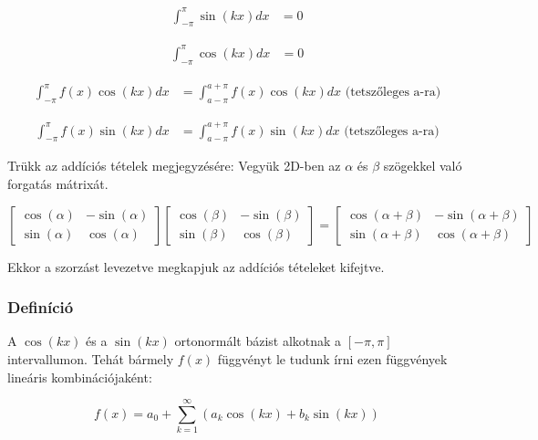\documentclass{article}
\begin{document}
\begin{align*}
    \int_{-\pi}^{\pi} \sin(kx) dx &= 0
\end{align*}


\begin{align*}
    \int_{-\pi}^{\pi} \cos(kx) dx &= 0
\end{align*}

\begin{align*}
    \int_{-\pi}^{\pi} f(x) \cos(kx) dx &= \int_{a -\pi}^{a+ \pi} f(x) \cos(kx) dx \text{ (tetszőleges a-ra)}
\end{align*}


\begin{align*}
    \int_{-\pi}^{\pi} f(x) \sin(kx) dx &= \int_{a -\pi}^{a+ \pi} f(x) \sin(kx) dx \text{ (tetszőleges a-ra)}
\end{align*}

\vspace{4mm}

Trükk az addíciós tételek megjegyzésére: Vegyük 2D-ben az $\alpha$ és $\beta$ szögekkel való forgatás mátrixát.

\begin{equation*}
    \begin{bmatrix} \cos(\alpha) & -\sin(\alpha) \\ \sin(\alpha) & \cos(\alpha) \end{bmatrix} \begin{bmatrix} \cos(\beta) & -\sin(\beta) \\ \sin(\beta) & \cos(\beta) \end{bmatrix} = \begin{bmatrix} \cos(\alpha + \beta) & -\sin(\alpha + \beta) \\ \sin(\alpha + \beta) & \cos(\alpha + \beta) \end{bmatrix}
\end{equation*}

Ekkor a szorzást levezetve megkapjuk az addíciós tételeket kifejtve.

\newpage

\subsubsection{Definíció}
A $\cos(kx)$ és a $\sin(kx)$ ortonormált bázist alkotnak a $[-\pi, \pi]$ intervallumon. Tehát bármely $f(x)$ függvényt le tudunk írni ezen függvények lineáris kombinációjaként:

\begin{equation*}
    f(x) = a_0 + \sum_{k=1}^{\infty} \left( a_k \cos(kx) + b_k \sin(kx) \right)
\end{equation*}
\end{document}
